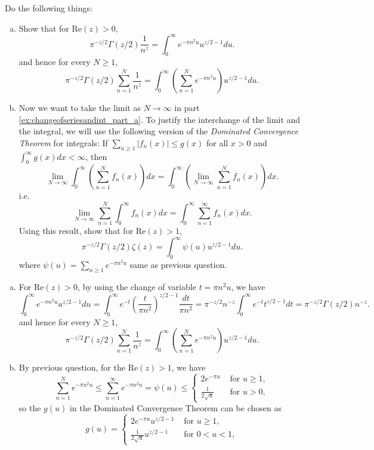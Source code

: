 \documentclass{elegantbook}
\begin{document}
\begin{problemset}[Exercises]
  \item Do the following things:
  \begin{enumerate}[(a)]
    \item \label{ex:changeofseriesandint_part_a}Show that for $\mathrm{Re}(z) > 0$,
    \[
      \pi^{-z/2}\Gamma(z/2) \frac{1}{n^z} = \int_{0}^{\infty} e^{-\pi n^2 u }u^{z/2 - 1} du.
    \]
    and hence for every $N\geq 1$,
    \[
      \pi^{-z/2}\Gamma(z/2) \sum_{n=1}^{N} \frac{1}{n^z} = \int_{0}^{\infty} \left( \sum_{n=1}^{N} e^{-\pi n^2 u } \right) u^{z/2 - 1} du.
    \]
    \item Now we want to take the limit as $N\to\infty$ in part \ref{ex:changeofseriesandint_part_a}. To justify the interchange of the limit and the integral, we will use the following version of the \textit{Dominated Convergence Theorem} for integrals:
    If $\sum_{n\geq 1}|f_n(x)| \leq g(x)$ for all $x>0$ and $\int_{0}^{\infty} g(x) dx < \infty$, then
    \[
      \lim_{N\to\infty} \int_{0}^{\infty} \left( \sum_{n=1}^{N} f_n(x) \right) dx = \int_{0}^{\infty} \left( \lim_{N\to\infty} \sum_{n=1}^{N} f_n(x) \right) dx.
    \]
    i.e.
    \[
      \lim_{N\to\infty} \sum_{n=1}^{N} \int_{0}^{\infty} f_n(x) dx = \int_{0}^{\infty} \sum_{n=1}^{\infty} f_n(x) dx.
    \]
    Using this result, show that for $\mathrm{Re}(z)>1$,
    \[
      \pi^{-z/2}\Gamma(z/2) \zeta(z) = \int_{0}^{\infty} \psi(u) u^{z/2 - 1} du.
    \]
    where $\psi(u) = \sum_{n\geq 1}e^{-\pi n^2 u}$ same as previous question.
  \end{enumerate}

  \begin{solution}
    \begin{enumerate}[(a)]
      \item For $\mathrm{Re}(z) > 0$, by using the change of variable $t = \pi n^2 u$, we have
      \[
        \int_{0}^{\infty} e^{-\pi n^2 u }u^{z/2 - 1} du = \int_{0}^{\infty} e^{-t} \left( \frac{t}{\pi n^2} \right)^{z/2 - 1} \frac{dt}{\pi n^2} = \pi^{-z/2} n^{-z} \int_{0}^{\infty} e^{-t} t^{z/2 - 1} dt = \pi^{-z/2} \Gamma(z/2) n^{-z}.
      \]
      and hence for every $N\geq 1$,
      \[
        \pi^{-z/2}\Gamma(z/2) \sum_{n=1}^{N} \frac{1}{n^z} = \int_{0}^{\infty} \left( \sum_{n=1}^{N} e^{-\pi n^2 u } \right) u^{z/2 - 1} du.
      \]
      \item By previous question, for the $\mathrm{Re}(z) > 1$, we have
      \[
        \sum_{n=1}^{N} e^{-\pi n^2 u } \leq \sum_{n=1}^{\infty} e^{-\pi n^2 u } = \psi(u) \leq
        \begin{cases}
          2e^{-\pi u} & \text{ for } u\geq 1, \\
          \frac{1}{2\sqrt{u}} & \text{ for } u>0,
        \end{cases}
      \]
      so the $g(u)$ in the Dominated Convergence Theorem can be chosen as\
      \[
        g(u) = \begin{cases}
          2e^{-\pi u} u^{z/2 - 1} & \text{ for } u\geq 1, \\
          \frac{1}{2\sqrt{u}} u^{z/2 - 1} & \text{ for } 0<u<1,
        \end{cases}
      \]


\end{enumerate}
\end{solution}
\end{problemset}
\end{document}
